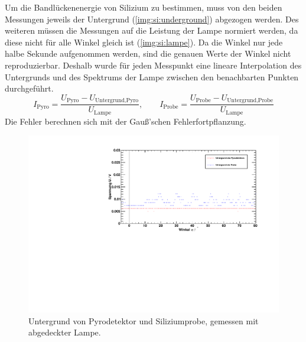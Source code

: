 Um die Bandlückenenergie von Silizium zu bestimmen, muss von den beiden Messungen jeweils der Untergrund (\autoref{img:si:underground}) abgezogen 
werden. Des weiteren müssen die Messungen auf die Leistung der Lampe normiert werden, da diese nicht für alle Winkel gleich ist 
(\autoref{img:si:lampe}). Da die Winkel nur jede halbe Sekunde aufgenommen werden, sind die genauen Werte der Winkel nicht reproduzierbar. 
Deshalb wurde für jeden Messpunkt eine lineare Interpolation des Untergrunds und des Spektrums der Lampe zwischen den benachbarten Punkten 
durchgeführt.
\begin{equation}
  I_{\text{Pyro}} = \frac{U_{\text{Pyro}} - U_{\text{Untergrund,Pyro}}}{U_{\text{Lampe}}}, \qquad I_{\text{Probe}} = \frac{U_{\text{Probe}} - U_{\text{Untergrund,Probe}}}{U_{\text{Lampe}}}
\end{equation}
Die Fehler berechnen sich mit der Gauß'schen Fehlerfortpflanzung.

\begin{figure}[H]
\begin{center}
  \includegraphics[width=\textwidth]{../img/part1/Si_Untergrund_spectrum.pdf}
  \caption{Untergrund von Pyrodetektor und Siliziumprobe, gemessen mit abgedeckter Lampe.}
  \label{img:si:underground}
\end{center}
\end{figure}

